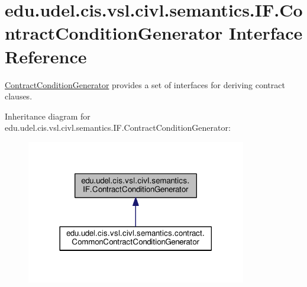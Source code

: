 \hypertarget{interfaceedu_1_1udel_1_1cis_1_1vsl_1_1civl_1_1semantics_1_1IF_1_1ContractConditionGenerator}{}\section{edu.\+udel.\+cis.\+vsl.\+civl.\+semantics.\+I\+F.\+Contract\+Condition\+Generator Interface Reference}
\label{interfaceedu_1_1udel_1_1cis_1_1vsl_1_1civl_1_1semantics_1_1IF_1_1ContractConditionGenerator}


\hyperlink{interfaceedu_1_1udel_1_1cis_1_1vsl_1_1civl_1_1semantics_1_1IF_1_1ContractConditionGenerator}{Contract\+Condition\+Generator} provides a set of interfaces for deriving contract clauses.  




Inheritance diagram for edu.\+udel.\+cis.\+vsl.\+civl.\+semantics.\+I\+F.\+Contract\+Condition\+Generator\+:
\nopagebreak
\begin{figure}[H]
\begin{center}
\leavevmode
\includegraphics[width=272pt]{interfaceedu_1_1udel_1_1cis_1_1vsl_1_1civl_1_1semantics_1_1IF_1_1ContractConditionGenerator__inherit__graph}
\end{center}
\end{figure}
